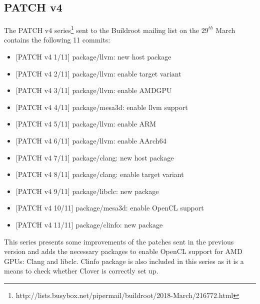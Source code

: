 \documentclass[12pt,a4paper,oneside]{article}
\begin{document}
\subsection*{PATCH v4}
The PATCH v4 series\footnote{http://lists.busybox.net/pipermail/buildroot/2018-March/216772.html}
sent to the Buildroot mailing list on the $29^{th}$ March contains the following
11 commits:
\begin{itemize}
  \item {[PATCH v4 1/11]} package/llvm: new host package
  \item {[PATCH v4 2/11]} package/llvm: enable target variant
  \item {[PATCH v4 3/11]} package/llvm: enable AMDGPU
  \item {[PATCH v4 4/11]} package/mesa3d: enable llvm support
  \item {[PATCH v4 5/11]} package/llvm: enable ARM
  \item {[PATCH v4 6/11]} package/llvm: enable AArch64
  \item {[PATCH v4 7/11]} package/clang: new host package
  \item {[PATCH v4 8/11]} package/clang: enable target variant
  \item {[PATCH v4 9/11]} package/libclc: new package
  \item {[PATCH v4 10/11]} package/mesa3d: enable OpenCL support
  \item {[PATCH v4 11/11]} package/clinfo: new package
\end{itemize}
This series presents some improvements of the patches sent in the previous version
and adds the necessary packages to enable OpenCL support for AMD GPUs: Clang and
libclc. Clinfo package is also included in this series as it is a means to check
whether Clover is correctly set up.

\newpage
\end{document}
